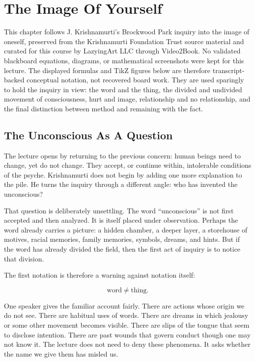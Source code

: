 \chapter{The Image Of Yourself}

This chapter follows J. Krishnamurti's Brockwood Park inquiry into the image of oneself, preserved from the Krishnamurti Foundation Trust source material and curated for this course by LazyingArt LLC through Video2Book. No validated blackboard equations, diagrams, or mathematical screenshots were kept for this lecture. The displayed formulas and TikZ figures below are therefore transcript-backed conceptual notation, not recovered board work. They are used sparingly to hold the inquiry in view: the word and the thing, the divided and undivided movement of consciousness, hurt and image, relationship and no relationship, and the final distinction between method and remaining with the fact.

\section{The Unconscious As A Question}

The lecture opens by returning to the previous concern: human beings need to change, yet do not change. They accept, or continue within, intolerable conditions of the psyche. Krishnamurti does not begin by adding one more explanation to the pile. He turns the inquiry through a different angle: who has invented the unconscious?

That question is deliberately unsettling. The word ``unconscious'' is not first accepted and then analyzed. It is itself placed under observation. Perhaps the word already carries a picture: a hidden chamber, a deeper layer, a storehouse of motives, racial memories, family memories, symbols, dreams, and hints. But if the word has already divided the field, then the first act of inquiry is to notice that division.

The first notation is therefore a warning against notation itself:

\begin{equation}
\text{word} \neq \text{thing}.
\end{equation}

One speaker gives the familiar account fairly. There are actions whose origin we do not see. There are habitual uses of words. There are dreams in which jealousy or some other movement becomes visible. There are slips of the tongue that seem to disclose intention. There are past wounds that govern conduct though one may not know it. The lecture does not need to deny these phenomena. It asks whether the name we give them has misled us.

